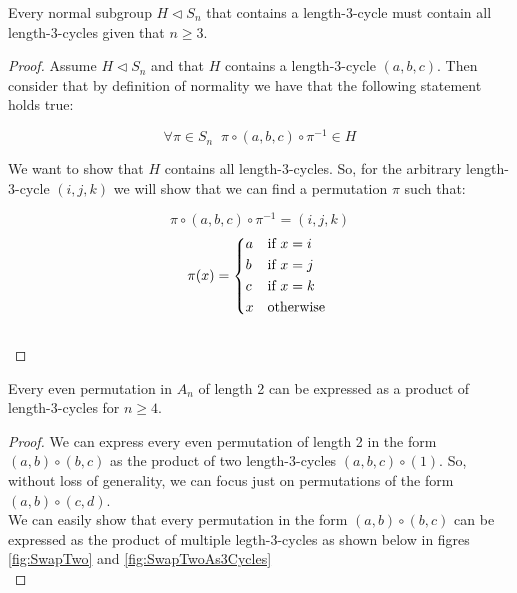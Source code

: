 \begin{lemma}
    \label{lem:everyThreeCycleIsInSubgroupsOfAN}
    Every normal subgroup $H \triangleleft S_n$ that contains a length-3-cycle must contain all 
    length-3-cycles given that $n \geq 3$.
\end{lemma}
\begin{proof}
    Assume $H \triangleleft S_n$ and that $H$ contains a length-3-cycle $(a,b,c)$. Then consider 
    that by definition of normality we have that the following statement holds true:

    $$ \forall \pi \in S_n\;\; \pi \circ (a,b,c) \circ \pi^{-1} \in H $$ \vspace{0.2em}

    We want to show that $H$ contains all length-3-cycles. So, for the arbitrary length-3-cycle
    $(i,j,k)$ we will show that we can find a permutation $\pi$ such that:

    $$ \pi \circ (a,b,c) \circ \pi^{-1} = (i,j,k) $$
    \begin{equation*}
        \pi(x) = 
        \begin{cases*}
            a      & \text{if} \( x = i \)  \\
            b      & \text{if} \( x = j \)  \\
            c      & \text{if} \( x = k \)  \\
            x      & \text{otherwise}       \\
        \end{cases*}
    \end{equation*} \\
\end{proof}

\newpage

\begin{lemma}
    Every even permutation in $A_n$ of length 2 can be expressed 
    as a product of length-3-cycles for $n \geq 4$.
\end{lemma}
\begin{proof}
    We can express every even permutation of length 2 in the form $(a,b) \circ (b,c)$ 
    as the product of two length-3-cycles $(a,b,c) \circ (1)$. So, without loss of generality,
    we can focus just on permutations of the form $(a,b) \circ (c,d)$.\\

    We can easily show that every permutation in the form $(a,b) \circ (b,c)$ can be 
    expressed as the product of multiple legth-3-cycles as shown below in figres \ref{fig:SwapTwo} and 
    \ref{fig:SwapTwoAs3Cycles} \\
\end{proof} \vspace{0.2em}

